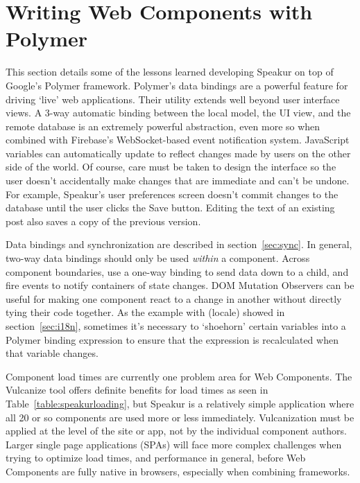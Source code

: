 \section{Writing Web Components with Polymer}
This section details some of the lessons learned developing Speakur on top of Google's Polymer framework.
Polymer's data bindings are a powerful feature for driving `live' web applications.
Their utility extends well beyond user interface views.
A 3-way automatic binding between the local model, the UI view, and the remote database is an extremely powerful abstraction,
even more so when combined with Firebase's 
Web\-Socket-based event notification system.
JavaScript variables can automatically update to reflect changes made by users on the other side of the world.
Of course, care must be taken to design the interface so the user doesn't accidentally make changes that are immediate and can't be undone. 
For example, Speakur's user preferences screen doesn't commit changes to the database until the user clicks the Save button.
Editing the text of an existing post also saves a copy of the previous version.

Data bindings and synchronization are described in section~\ref{sec:sync}.
In general, two-way data bindings should only be used \textit{within} a component.
Across component boundaries, use a one-way binding to send data down to a child,
and fire events to notify containers of state changes.
DOM Mutation Observers can be useful for making one component react to a change in another without directly tying their code together.
As the example with  (locale) showed in section~\ref{sec:i18n}, 
sometimes it's necessary to `shoehorn' certain variables into a Polymer binding expression 
to ensure that the expression is recalculated when that variable changes.

Component load times are currently one problem area for Web Components.
The Vulcanize tool offers definite benefits for load times as seen in Table~\ref{table:speakurloading},
but Speakur is a relatively simple application where all 20 or so components are used more or less immediately.
Vulcanization must be applied at the level of the site or app, not by the individual component authors.
Larger single page applications (SPAs) will face more complex challenges when trying to optimize load times, and performance in general,
before Web Components are fully native in browsers, especially when combining frameworks.


